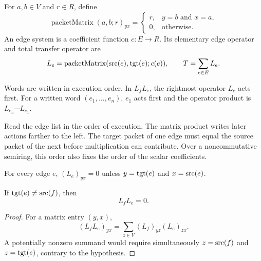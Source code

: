 \begin{definition}
\label{def:edge-system}
For $a,b\in V$ and $r\in R$, define
\[
  \operatorname{packetMatrix}(a,b;r)_{yx}
  =
  \begin{cases}
  r,&y=b\text{ and }x=a,\\
  0,&\text{otherwise}.
  \end{cases}
\]
An edge system is a coefficient function $c:E\to R$.  Its elementary edge
operator and total transfer operator are
\[
  L_e=\operatorname{packetMatrix}(\operatorname{src}(e),\operatorname{tgt}(e);c(e)),
  \qquad
  T=\sum_{e\in E}L_e.
\]
\end{definition}

Words are written in execution order. In $L_fL_e$, the rightmost operator
$L_e$ acts first. For a written word $(e_1,\ldots,e_n)$, $e_1$ acts first
and the operator product is $L_{e_n}\cdots L_{e_1}$.

\begin{keyidea}[title={Reading the execution order}]
Read the edge list in the order of execution. The matrix product writes later
actions farther to the left. The target packet of one edge must equal the
source packet of the next before multiplication can contribute. Over a noncommutative
semiring, this order also fixes the order of the scalar coefficients.
\end{keyidea}

\begin{lemma}
\label{lem:edge-support}
For every edge $e$, $(L_e)_{yx}=0$ unless
$y=\operatorname{tgt}(e)$ and $x=\operatorname{src}(e)$.
\end{lemma}

\begin{theorem}
\label{thm:edge-annihilation}
If $\operatorname{tgt}(e)\ne\operatorname{src}(f)$, then
\[
  L_fL_e=0.
\]
\end{theorem}

\begin{proof}
For a matrix entry $(y,x)$,
\[
  (L_fL_e)_{yx}=\sum_{z\in V}(L_f)_{yz}(L_e)_{zx}.
\]
A potentially nonzero summand would require simultaneously
$z=\operatorname{src}(f)$ and $z=\operatorname{tgt}(e)$, contrary to the hypothesis.
\end{proof}

